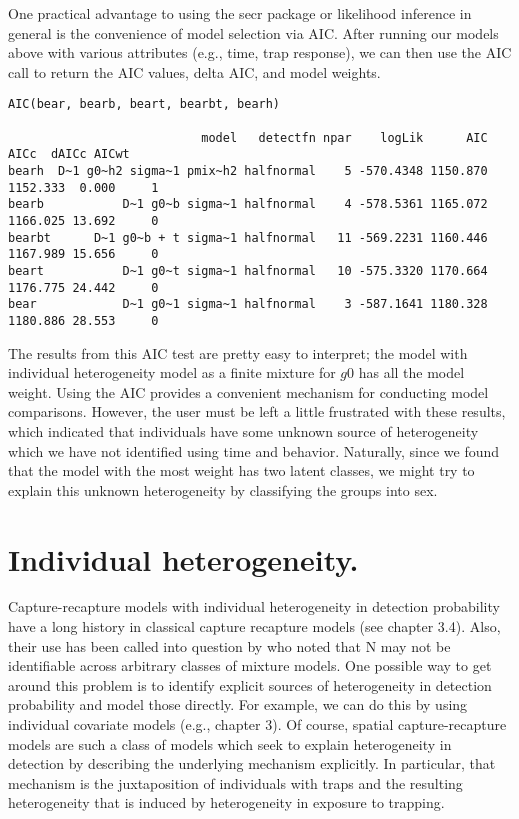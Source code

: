 One practical advantage to using the secr package or likelihood
inference in general is the convenience of model selection via AIC.
After running our models above with various attributes (e.g., time,
trap response), we can then use the AIC call to return the AIC values,
delta AIC, and model weights.

\begin{verbatim}
AIC(bear, bearb, beart, bearbt, bearh)

                           model   detectfn npar    logLik      AIC     AICc  dAICc AICwt
bearh  D~1 g0~h2 sigma~1 pmix~h2 halfnormal    5 -570.4348 1150.870 1152.333  0.000     1
bearb           D~1 g0~b sigma~1 halfnormal    4 -578.5361 1165.072 1166.025 13.692     0
bearbt      D~1 g0~b + t sigma~1 halfnormal   11 -569.2231 1160.446 1167.989 15.656     0
beart           D~1 g0~t sigma~1 halfnormal   10 -575.3320 1170.664 1176.775 24.442     0
bear            D~1 g0~1 sigma~1 halfnormal    3 -587.1641 1180.328 1180.886 28.553     0
\end{verbatim}
The results from this AIC test are pretty easy to interpret; the model
with individual heterogeneity model as a finite mixture for $g0$ has all
the model weight.  Using the AIC provides a convenient mechanism for
conducting model comparisons.  However, the user must be left a little
frustrated with these results, which indicated that individuals have
some unknown source of heterogeneity which we have not identified
using time and behavior.  Naturally, since we found that the model
with the most weight has two latent classes, we might try to explain
this unknown heterogeneity by classifying the groups into sex. 

\section{Individual heterogeneity.}

Capture-recapture models with individual heterogeneity in detection
probability have a long history in classical capture recapture models
(see chapter 3.4). Also, their use has been called into question by
\citet{link:2003} who noted that N may not be identifiable across
arbitrary classes of mixture models.  One possible way to get around
this problem is to identify explicit sources of heterogeneity in
detection probability and model those directly. For example, we can do
this by using individual covariate models (e.g., chapter 3).  Of
course, spatial capture-recapture models are such a class of models
which seek to explain heterogeneity in detection by describing the
underlying mechanism explicitly. In particular, that mechanism is the
juxtaposition of individuals with traps and the resulting
heterogeneity that is induced by heterogeneity in exposure to
trapping.

